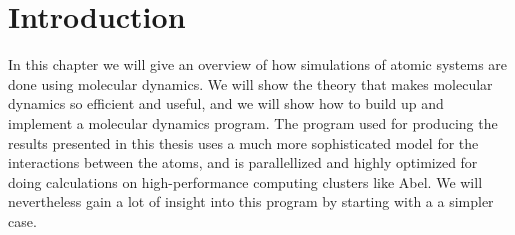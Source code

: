 \chapter{Introduction}
In this chapter we will give an overview of how simulations of atomic systems are done using molecular dynamics. We will show the theory that makes molecular dynamics so efficient and useful, and we will show how to build up and implement a molecular dynamics program. The program used for producing the results presented in this thesis uses a much more sophisticated model for the interactions between the atoms, and is parallellized and highly optimized for doing calculations on high-performance computing clusters like Abel. We will nevertheless gain a lot of insight into this program by starting with a a simpler case.

% 
% 
% 
% 

